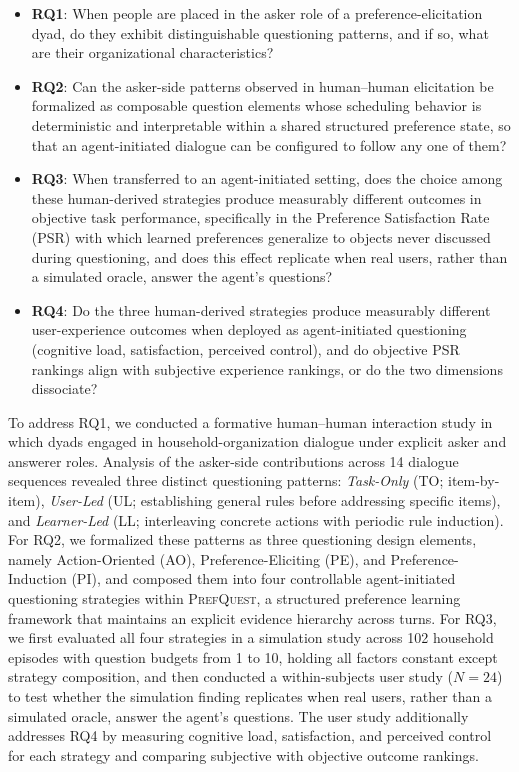 \documentclass[manuscript,review,anonymous]{acmart}
\begin{document}
\begin{itemize}[leftmargin=*]
    \item \textbf{RQ1}: When people are placed in the asker role of a preference-elicitation dyad, do they exhibit distinguishable questioning patterns, and if so, what are their organizational characteristics?
    \item \textbf{RQ2}: Can the asker-side patterns observed in human--human elicitation be formalized as composable question elements whose scheduling behavior is deterministic and interpretable within a shared structured preference state, so that an agent-initiated dialogue can be configured to follow any one of them?
    \item \textbf{RQ3}: When transferred to an agent-initiated setting, does the choice among these human-derived strategies produce measurably different outcomes in objective task performance, specifically in the Preference Satisfaction Rate (PSR) with which learned preferences generalize to objects never discussed during questioning, and does this effect replicate when real users, rather than a simulated oracle, answer the agent's questions?
    \item \textbf{RQ4}: Do the three human-derived strategies produce measurably different user-experience outcomes when deployed as agent-initiated questioning (cognitive load, satisfaction, perceived control), and do objective PSR rankings align with subjective experience rankings, or do the two dimensions dissociate?
\end{itemize}

To address RQ1, we conducted a formative human--human interaction study in which dyads engaged in household-organization dialogue under explicit asker and answerer roles. Analysis of the asker-side contributions across 14 dialogue sequences revealed three distinct questioning patterns: \textit{Task-Only} (TO; item-by-item), \textit{User-Led} (UL; establishing general rules before addressing specific items), and \textit{Learner-Led} (LL; interleaving concrete actions with periodic rule induction). For RQ2, we formalized these patterns as three questioning design elements, namely Action-Oriented (AO), Preference-Eliciting (PE), and Preference-Induction (PI), and composed them into four controllable agent-initiated questioning strategies within \textsc{PrefQuest}, a structured preference learning framework that maintains an explicit evidence hierarchy across turns. For RQ3, we first evaluated all four strategies in a simulation study across 102 household episodes with question budgets from 1 to 10, holding all factors constant except strategy composition, and then conducted a within-subjects user study ($N = 24$) to test whether the simulation finding replicates when real users, rather than a simulated oracle, answer the agent's questions. The user study additionally addresses RQ4 by measuring cognitive load, satisfaction, and perceived control for each strategy and comparing subjective with objective outcome rankings.
\end{document}
